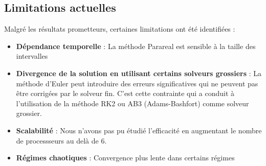 

    
    

\subsection{Limitations actuelles}

Malgré les résultats prometteurs, certaines limitations ont été identifiées :

\begin{itemize}
    \item \textbf{Dépendance temporelle} : La méthode Parareal est sensible à la taille des intervalles
    \item \textbf{Divergence de la solution en utilisant certains solveurs grossiers} : La méthode d'Euler peut introduire des erreurs significatives qui ne peuvent pas être corrigées par le solveur fin. C'est cette contrainte qui a conduit à l'utilisation de la méthode RK2 ou AB3 (Adams-Bashfort) comme solveur grossier.
    \item \textbf{Scalabilité} : Nous n'avons pas pu étudié l'efficacité en augmentant le nombre de processseurs au delà de 6.
    \item \textbf{Régimes chaotiques} : Convergence plus lente dans certains régimes 
\end{itemize}

